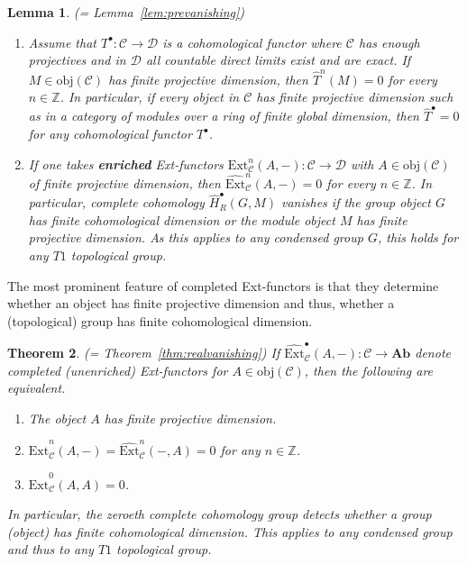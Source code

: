 \documentclass[12pt, a4paper]{article}
\numberwithin{equation}{section}
\newtheorem{thm}{Theorem}[section]
\newtheorem{lem}[thm]{Lemma}
\theoremstyle{empty}
\theoremstyle{nonumberplain}
\begin{document}
\begin{lem} (= Lemma~\ref{lem:prevanishing})
\begin{enumerate}
    \item Assume that $T^{\bullet}: \mathcal{C} \rightarrow \mathcal{D}$ is a cohomological functor where $\mathcal{C}$ has enough projectives and in $\mathcal{D}$ all countable direct limits exist and are exact. If $M \in \mathrm{obj}(\mathcal{C})$ has finite projective dimension, then $\widehat{T}^n(M) = 0$ for every $n \in \mathbb{Z}$. In particular, if every object in $\mathcal{C}$ has finite projective dimension such as in a category of modules over a ring of finite global dimension, then $\widehat{T}^{\bullet} = 0$ for any cohomological functor $T^{\bullet}$.
    \item If one takes \textbf{enriched} Ext-functors $\mathrm{Ext}_{\mathcal{C}}^n(A, -): \mathcal{C} \rightarrow \mathcal{D}$ with $A \in \mathrm{obj}(\mathcal{C})$ of finite projective dimension, then $\widehat{\mathrm{Ext}}_{\mathcal{C}}^n(A, -) = 0$ for every $n \in \mathbb{Z}$. In particular, complete cohomology $\widehat{H}_R^{\bullet}(G, M)$ vanishes if the group object $G$ has finite cohomological dimension or the module object $M$ has finite projective dimension. As this applies to any condensed group $G$, this holds for any $T1$ topological group.
\end{enumerate}
\end{lem}

The most prominent feature of completed Ext-functors is that they determine whether an object has finite projective dimension and thus, whether a (topological) group has finite cohomological dimension.

\begin{thm}\label{thm:vanishing}
(= Theorem~\ref{thm:realvanishing}) If $\widehat{\mathrm{Ext}}_{\mathcal{C}}^{\bullet}(A, -): \mathcal{C} \rightarrow \mathbf{Ab}$ denote completed (unenriched) Ext-functors for $A \in \mathrm{obj}(\mathcal{C})$, then the following are equivalent.
\begin{enumerate}
\item The object $A$ has finite projective dimension.
\item $\widehat{\mathrm{Ext}}_{\mathcal{C}}^n(A, -) = \widehat{\mathrm{Ext}}_{\mathcal{C}}^n(-, A) = 0$ for any $n \in \mathbb{Z}$.
\item $\widehat{\mathrm{Ext}}_{\mathcal{C}}^0(A, A) = 0$.
\end{enumerate}
In particular, the zeroeth complete cohomology group detects whether a group (object) has finite cohomological dimension. This applies to any condensed group and thus to any $T1$ topological group.
\end{thm}
\end{document}
